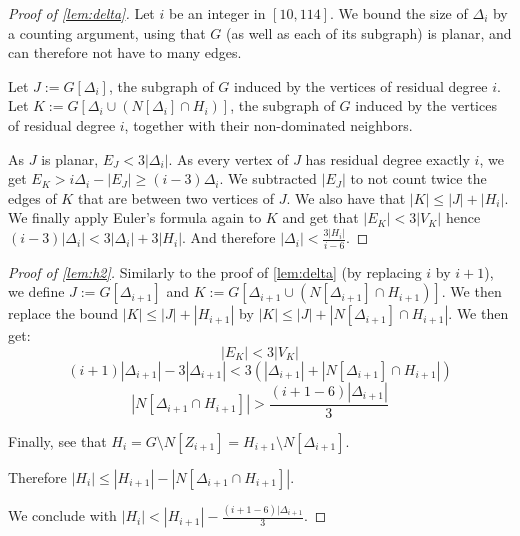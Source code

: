 \documentclass[a4paper,UKenglish,thm-restate,numberwithinsect]{lipics-v2021}
\begin{document}
\begin{proof}[Proof of \cref{lem:delta}]
  Let $i$ be an integer in $[10,114]$. We bound the size of $\Delta_i$ by a
  counting argument, using that $G$ (as well as each of its subgraph) is planar,
  and can therefore not have to many edges.

  Let $J := G[\Delta_i]$, the subgraph of $G$ induced by the vertices of
  residual degree $i$. Let $K := G[\Delta_i \cup (N[\Delta_i]\cap H_i)]$,
  the subgraph of $G$ induced by the vertices of residual degree $i$, together
  with their non-dominated neighbors.

  As $J$ is planar, $E_J < 3|\Delta_i|$. As every vertex of $J$ has residual degree
  exactly $i$, we get $E_K > i\Delta_i - |E_J| \ge (i-3)\Delta_i$. We subtracted $|E_J|$ to not count twice
  the edges of $K$ that are between two vertices of $J$.
  We also have that $|K| \le |J| + |H_i|$. We finally apply Euler's formula again to $K$ and get that
  $|E_K| < 3|V_K|$ hence $(i-3)|\Delta_i| < 3|\Delta_i| + 3|H_i|$. And therefore $|\Delta_i|< \frac{3|H_i|}{i-6}$.
\end{proof}

\begin{proof}[Proof of \cref{lem:h2}]
  Similarly to the proof of \cref{lem:delta} (by replacing $i$ by $i+1$),
  we define $J := G[\Delta_{i+1}]$ and $K:= G[\Delta_{i+1} \cup (N[\Delta_{i+1}]\cap H_{i+1})]$.
  We then replace the bound $|K| \le |J| + |H_{i+1}|$ by $|K| \le |J| + |N[\Delta_{i+1}]\cap H_{i+1}|$. We then get:
  \[|E_K| < 3 |V_K| \]
  \[(i+1)|\Delta_{i+1}| - 3|\Delta_{i+1}| < 3(|\Delta_{i+1}| + |N[\Delta_{i+1}]\cap H_{i+1}|)\]
  \[ |N[\Delta_{i+1}\cap H_{i+1}]| > \frac{(i+1-6)|\Delta_{i+1}|}{3}\]

  Finally, see that $H_i = G\setminus N[Z_{i+1}] = H_{i+1} \setminus N[\Delta_{i+1}]$.

  Therefore $|H_i| \le |H_{i+1}| - |N[\Delta_{i+1}\cap H_{i+1}]|$.

  We conclude with $|H_i| < |H_{i+1}| - \frac{(i+1-6)|\Delta_{i+1}}{3}$.


\end{proof}
\end{document}

